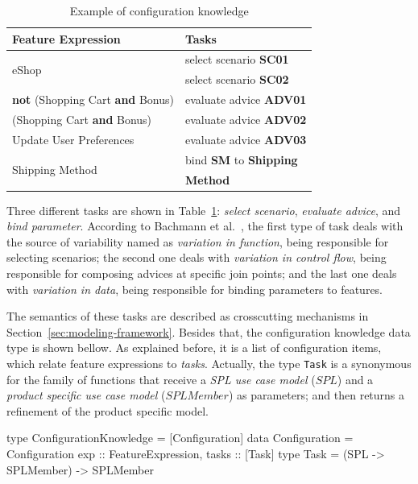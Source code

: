 \begin{table}[htb]
\begin{small}
\begin{tabular}{||lp{1.4in}||}
\hline
Feature Expression  						& Tasks					 \\ \hline \hline

\multirow{2}{*}{eShop}						& select scenario {\bf SC01} \\
											& select scenario {\bf SC02} \\	 \hline
{\bf not} (Shopping Cart {\bf and} Bonus) 	& evaluate advice {\bf ADV01} \\ \hline 
(Shopping Cart {\bf and} Bonus) 		& evaluate advice {\bf ADV02} 	\\   \hline
Update User Preferences 				& evaluate advice {\bf ADV03} \\     \hline 
\multirow{2}{*}{Shipping Method}		& bind {\bf SM} to {\bf Shipping} \\  
										& {\bf Method}\\ \hline
								
\end{tabular}
\end{small}
\caption{Example of configuration knowledge}
\label{tab:eshop-ck}
\end{table}

Three different tasks are shown
in Table~\ref{tab:eshop-ck}: \emph{select scenario}, \emph{evaluate advice}, and
\emph{bind parameter}. According to Bachmann et
al.~\cite{Bachmann:2001aa}, the first type of task deals with the source of
variability named as \emph{variation in function}, being responsible for
selecting scenarios; the second one deals with \emph{variation in control flow},
being responsible for composing advices at specific join points; and the last one
deals with \emph{variation in data}, being responsible for binding parameters to
features.

The semantics of these tasks are described as crosscutting mechanisms
in Section~\ref{sec:modeling-framework}. Besides that, the configuration knowledge data type is shown bellow. As explained before, it is a list of configuration items, which relate feature expressions to
\emph{tasks}. Actually, the type \texttt{Task} is a synonymous for the
family of functions that receive a \emph{SPL use case model} ($SPL$) and a \emph{product
specific use case model} ($SPLMember$) as parameters; and then returns a
refinement of the product specific model.
 
 \begin{code}
 type ConfigurationKnowledge = [Configuration]
 data Configuration = Configuration {
  exp :: FeatureExpression,
  tasks :: [Task] 	
 }
 type Task = (SPL -> SPLMember) -> SPLMember
\end{code}

